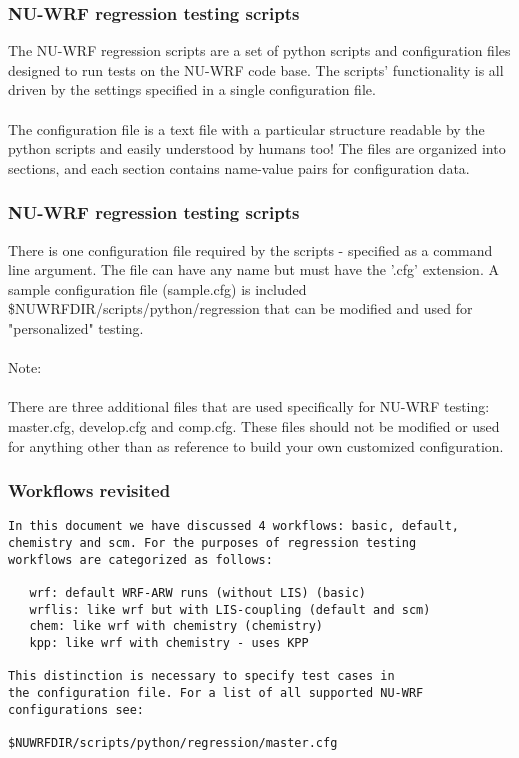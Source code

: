 \begin{frame}[fragile]\frametitle{NU-WRF regression testing scripts}


The NU-WRF regression scripts are a set of python scripts and configuration
files designed to run tests on the NU-WRF code base.
The scripts' functionality is all driven by the settings specified in a single
configuration file.\\
\mbox{}\\
The configuration file is a text file with a particular structure readable by
the python scripts and easily understood by humans too! The files are organized
into sections, and each section contains name-value pairs for configuration data.\\

\end{frame}

\begin{frame}[fragile]\frametitle{NU-WRF regression testing scripts}

There is one configuration file required by the scripts - specified as a command
line argument. The file can have any name but must have the '.cfg' extension.
A sample configuration file (sample.cfg) is included \$NUWRFDIR/scripts/python/regression
that can be modified and used for "personalized" testing. \\
\mbox{}\\
Note:\\
\mbox{}\\
There are three additional files that are used specifically for NU-WRF testing:
master.cfg, develop.cfg and comp.cfg. These files should not be modified or used for anything
other than as reference to build your own customized configuration.

\end{frame}


\begin{frame}[fragile]\frametitle{Workflows revisited}

\footnotesize{
\begin{verbatim}
In this document we have discussed 4 workflows: basic, default, 
chemistry and scm. For the purposes of regression testing 
workflows are categorized as follows:

   wrf: default WRF-ARW runs (without LIS) (basic)
   wrflis: like wrf but with LIS-coupling (default and scm)
   chem: like wrf with chemistry (chemistry)
   kpp: like wrf with chemistry - uses KPP

This distinction is necessary to specify test cases in 
the configuration file. For a list of all supported NU-WRF
configurations see: 

$NUWRFDIR/scripts/python/regression/master.cfg
\end{verbatim}
}

\end{frame}


